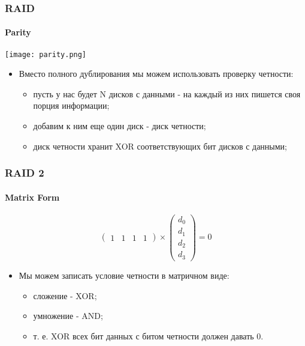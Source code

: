 \begin{frame}
\frametitle{RAID}
\framesubtitle{Parity}
\begin{center}
  \texttt{[image: parity.png]}
\end{center}
\begin{itemize}
  \item Вместо полного дублирования мы можем использовать проверку четности:
  \begin{itemize}
    \item пусть у нас будет N дисков с данными - на каждый из них пишется своя
    порция информации;
    \item добавим к ним еще один диск - диск четности;
    \item диск четности хранит XOR соответствующих бит дисков с данными;
  \end{itemize}
\end{itemize}
\end{frame}

\begin{frame}
\frametitle{RAID 2}
\framesubtitle{Matrix Form}
\[
  \left(
    \begin{array}{cccc}
      1 & 1 & 1 & 1
    \end{array}
  \right) \times \left(
    \begin{array}{c}
      d_0 \\
      d_1 \\
      d_2 \\
      d_3
    \end{array}
  \right) = 0
\]
\begin{itemize}
  \item Мы можем записать условие четности в матричном виде:
  \begin{itemize}
    \item сложение - XOR;
    \item умножение - AND;
    \item т. е. XOR всех бит данных с битом четности должен давать 0.
  \end{itemize}
\end{itemize}
\end{frame}


